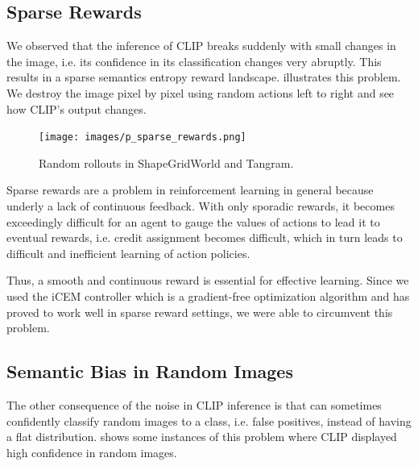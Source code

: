 \subsection{Sparse Rewards} %
\label{sec:sparse-rewards}

We observed that the inference of CLIP breaks suddenly with small changes in the image, i.e. its confidence in its classification changes very abruptly.
This results in a sparse semantics entropy reward landscape.
 illustrates this problem.
We destroy the image pixel by pixel using random actions left to right and see how CLIP's output changes.

\begin{figure}[h]
    \centering
    \texttt{[image: images/p\_sparse\_rewards.png]}
    \caption{Random rollouts in ShapeGridWorld and Tangram.}
    \label{fig:sparse-rewards}
\end{figure}

Sparse rewards are a problem in reinforcement learning in general because underly a lack of continuous feedback. 
With only sporadic rewards, it becomes exceedingly difficult for an agent to gauge the values of actions to lead it to eventual rewards, i.e. credit assignment becomes difficult, which in turn leads to difficult and inefficient learning of action policies.


Thus, a smooth and continuous reward is essential for effective learning.
Since we used the iCEM controller which is a gradient-free optimization algorithm and has proved to work well in sparse reward settings, we were able to circumvent this problem.

\subsection{Semantic Bias in Random Images} %
\label{sec:inference-noise}
The other consequence of the noise in CLIP inference is that can sometimes confidently classify random images to a class, i.e. false positives, instead of having a flat distribution.
 shows some instances of this problem where CLIP displayed high confidence in random images.

